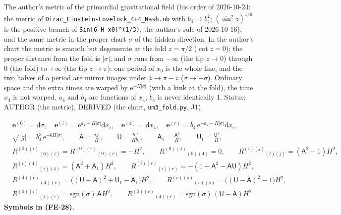 \documentclass[
  10pt,
]{article}
\begin{document}
The author's metric of the primordial gravitational field (his order of
2026-10-24: the metric of
\texttt{Dirac\_Einstein-Lovelock\_4+4\_Nash.nb} with \(b_4 \to b_4^2\);
\((\sin^2z)^{1/6}\) is the positive branch of
\texttt{Sin{[}6\ H\ x0{]}\^{}(1/3)}, the author's rule of 2026-10-16),
and the same metric in the proper chart \(\sigma\) of the hidden
direction. In the author's chart the metric is smooth but degenerate at
the fold \(z = \pi/2\) (\(\cot z = 0\)); the proper distance from the
fold is \(\lvert\sigma\rvert\), and \(\sigma\) runs from \(-\infty\)
(the tip \(z \to 0\)) through \(0\) (the fold) to \(+\infty\) (the tip
\(z \to \pi\)): one period of \(x_0\) is the whole line, and the two
halves of a period are mirror images under \(z \to \pi - z\)
(\(\sigma \to -\sigma\)). Ordinary space and the extra times are warped
by \(\mathrm{e}^{-H\lvert\sigma\rvert}\) (with a kink at the fold), the
time \(x_4\) is not warped. \(a_4\) and \(b_4\) are functions of
\(x_4\); \(b_4\) is never identically 1. Status: AUTHOR (the metric),
DERIVED (the chart, \texttt{um3\_fold.py}, J1).

\[
\begin{aligned}
&\mathbf{e}^{(0)} = \mathrm{d}\sigma,\quad \mathbf{e}^{(i)} = \mathrm{e}^{a_4 - H\lvert\sigma\rvert}\mathrm{d}x_i,\quad
 \mathbf{e}^{(4)} = \mathrm{d}x_4,\quad \mathbf{e}^{(r)} = b_4\,\mathrm{e}^{-a_4 - H\lvert\sigma\rvert}\mathrm{d}x_r,\\
&\sqrt{\lvert g\rvert} = b_4^3\,\mathrm{e}^{-6H\lvert\sigma\rvert},\qquad
 \mathsf{A} = \frac{a_4'}{H},\qquad \mathsf{U} = \frac{b_4'}{Hb_4},\qquad \mathsf{A}_1 = \frac{\mathsf{A}'}{H},\qquad
 \mathsf{U}_1 = \frac{\mathsf{U}'}{H},\\
&R^{(0)(i)}{}_{(0)(i)} = R^{(0)(r)}{}_{(0)(r)} = -H^2,\qquad R^{(0)(4)}{}_{(0)(4)} = 0,\qquad
 R^{(i)(j)}{}_{(i)(j)} = (\mathsf{A}^2 - 1)H^2,\\
&R^{(i)(4)}{}_{(i)(4)} = (\mathsf{A}^2 + \mathsf{A}_1)H^2,\qquad
 R^{(i)(r)}{}_{(i)(r)} = -(1 + \mathsf{A}^2 - \mathsf{A}\mathsf{U})H^2,\\
&R^{(4)(r)}{}_{(4)(r)} = \big((\mathsf{U} - \mathsf{A})^2 + \mathsf{U}_1 - \mathsf{A}_1\big)H^2,\qquad
 R^{(r)(s)}{}_{(r)(s)} = \big((\mathsf{U} - \mathsf{A})^2 - 1\big)H^2,\\
&R^{(0)(i)}{}_{(4)(i)} = \mathrm{sgn}(\sigma)\,\mathsf{A}H^2,\qquad
 R^{(0)(r)}{}_{(4)(r)} = \mathrm{sgn}(\sigma)\,(\mathsf{U} - \mathsf{A})H^2
\end{aligned} \tag{FE-28}
\] \textbf{Symbols in (FE-28).}
\end{document}
